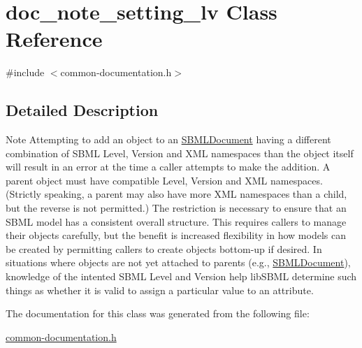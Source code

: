 \hypertarget{classdoc__note__setting__lv}{}\section{doc\+\_\+note\+\_\+setting\+\_\+lv Class Reference}
\label{classdoc__note__setting__lv}


{\ttfamily \#include $<$common-\/documentation.\+h$>$}



\subsection{Detailed Description}
\begin{DoxyNote}{Note}
Attempting to add an object to an \hyperlink{class_s_b_m_l_document}{S\+B\+M\+L\+Document} having a different combination of S\+B\+ML Level, Version and X\+ML namespaces than the object itself will result in an error at the time a caller attempts to make the addition. A parent object must have compatible Level, Version and X\+ML namespaces. (Strictly speaking, a parent may also have more X\+ML namespaces than a child, but the reverse is not permitted.) The restriction is necessary to ensure that an S\+B\+ML model has a consistent overall structure. This requires callers to manage their objects carefully, but the benefit is increased flexibility in how models can be created by permitting callers to create objects bottom-\/up if desired. In situations where objects are not yet attached to parents (e.\+g., \hyperlink{class_s_b_m_l_document}{S\+B\+M\+L\+Document}), knowledge of the intented S\+B\+ML Level and Version help lib\+S\+B\+ML determine such things as whether it is valid to assign a particular value to an attribute. 
\end{DoxyNote}


The documentation for this class was generated from the following file\+:\begin{DoxyCompactItemize}
\item 
\hyperlink{common-documentation_8h}{common-\/documentation.\+h}\end{DoxyCompactItemize}
